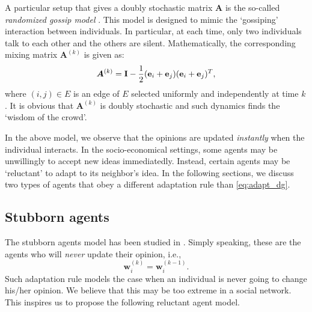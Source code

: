 \documentclass[letter]{article}
\theoremstyle{remark}
\begin{document}
A particular setup that gives a doubly stochastic matrix ${\bm A}$ is the so-called \emph{randomized gossip model} \cite{Boyd2006}. 
This model is designed to mimic the `gossiping' interaction between individuals. In particular, at each time, only two individuals talk to each other and the others are silent. 
Mathematically, the corresponding mixing matrix ${\bm A}^{(k)}$ is given as:
\[
{\bm A}^{(k)} = {\bf I} - \frac{1}{2} ({\bf e}_i + {\bf e}_j) ({\bf e}_i + {\bf e}_j)^T,
\]
where $(i,j) \in E$ is an edge of $E$ selected uniformly and independently at time $k$. 
It is obvious that ${\bm A}^{(k)}$ is doubly stochastic and such dynamics finds the `wisdom of the crowd'. 


In the above model, we observe that the opinions are updated \emph{instantly} when the individual interacts. In the socio-economical settings, some agents may be unwillingly to accept new ideas immediatedly. Instead, certain agents may be `reluctant' to adapt to its neighbor's idea. In the following sections, we discuss two types of agents that obey a different adaptation rule than \eqref{eq:adapt_dg}. 

\subsection{Stubborn agents} 
The stubborn agents model has been studied in \cite{Acemoglu2013}. Simply speaking, these are the agents who will \emph{never} update their opinion, i.e.,
\begin{equation} \label{eq:adapt_stubborn}
{\bm w}_i^{(k)} = {\bm w}_i^{(k-1)}.
\end{equation}
Such adaptation rule models the case when an individual is never going to change his/her opinion. We believe that this may be too extreme in a social network. This inspires us to propose the following reluctant agent model. 
\end{document}
